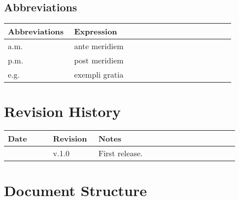 \subsection{Abbreviations}

\begin{center}
	\begin{tabular}{@{}p{0.28\linewidth} p{0.68\linewidth}@{}}
		\toprule
		\textbf{Abbreviations}  & \textbf{Expression}\\
		\midrule
	    a.m. & ante meridiem\\
	    p.m. & post meridiem\\
	    e.g. & exempli gratia\\
		\bottomrule
	\end{tabular}
\end{center}

\section{Revision History}

\begin{center}
	\begin{tabular}{@{}p{0.18\linewidth} p{0.18\linewidth} p{0.57\linewidth}@{}}
		\toprule
		\textbf{Date}   & \textbf{Revision} & \textbf{Notes}\\
		\midrule
		\date{}         & v.1.0             & First release.\\
		\bottomrule
	\end{tabular}
\end{center}

\printbibliography[title={Reference Documents},keyword=intro, heading=subbibnumbered]

\section{Document Structure}

